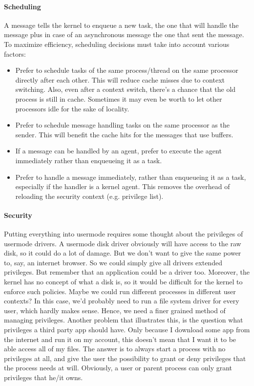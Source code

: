 \documentclass[a4paper]{article}
\begin{document}
\paragraph{Scheduling} A message tells the kernel to enqueue a new task, the one that will handle the message plus in case of an asynchronous message the one that sent the message. To maximize efficiency, scheduling decisions must take into account various factors:

\begin{itemize}
  \item Prefer to schedule tasks of the same process/thread on the same processor directly after each other. This will reduce cache misses due to context switching. Also, even after a context switch, there's a chance that the old process is still in cache. Sometimes it may even be worth to let other processors idle for the sake of locality.
  \item Prefer to schedule message handling tasks on the same processor as the sender. This will benefit the cache hits for the messages that use buffers.
  \item If a message can be handled by an agent, prefer to execute the agent immediately rather than enqueueing it as a task.
  \item Prefer to handle a message immediately, rather than enqueueing it as a task, especially if the handler is a kernel agent. This removes the overhead of reloading the security context (e.g. privilege list).
\end{itemize}


\paragraph{Security} Putting everything into usermode requires some thought about the privileges of usermode drivers. A usermode disk driver obviously will have access to the raw disk, so it could do a lot of damage. But we don't want to give the same power to, say, an internet browser. So we could simply give all drivers extended privileges. But remember that an application could be a driver too. Moreover, the kernel has no concept of what a disk is, so it would be difficult for the kernel to enforce such policies. Maybe we could run different processes in different user contexts? In this case, we'd probably need to run a file system driver for every user, which hardly makes sense. Hence, we need a finer grained method of managing privileges. Another problem that illustrates this, is the question what privileges a third party app should have. Only because I download some app from the internet and run it on my account, this doesn't mean that I want it to be able access all of my files. The answer is to always start a process with no privileges at all, and give the user the possibility to grant or deny privileges that the process needs at will. Obviously, a user or parent process can only grant privileges that he/it owns.
\end{document}
